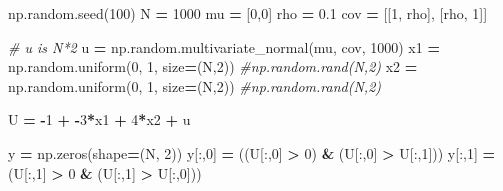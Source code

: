 \documentclass[
]{book}
\newenvironment{Shaded}{\begin{snugshade}}{\end{snugshade}}
\newcommand{\CommentTok}[1]{\textcolor[rgb]{0.56,0.35,0.01}{\textit{#1}}}
\newcommand{\DecValTok}[1]{\textcolor[rgb]{0.00,0.00,0.81}{#1}}
\newcommand{\FloatTok}[1]{\textcolor[rgb]{0.00,0.00,0.81}{#1}}
\newcommand{\NormalTok}[1]{#1}
\newcommand{\OperatorTok}[1]{\textcolor[rgb]{0.81,0.36,0.00}{\textbf{#1}}}
\theoremstyle{definition}
\theoremstyle{definition}
\theoremstyle{definition}
\theoremstyle{remark}
\begin{document}
\begin{Shaded}
\begin{Highlighting}[]
\NormalTok{np.random.seed(}\DecValTok{100}\NormalTok{)}
\NormalTok{N }\OperatorTok{=} \DecValTok{1000}
\NormalTok{mu }\OperatorTok{=}\NormalTok{ [}\DecValTok{0}\NormalTok{,}\DecValTok{0}\NormalTok{]}
\NormalTok{rho }\OperatorTok{=} \FloatTok{0.1}
\NormalTok{cov }\OperatorTok{=}\NormalTok{ [[}\DecValTok{1}\NormalTok{, rho], [rho, }\DecValTok{1}\NormalTok{]]}

\CommentTok{\# u is N*2}
\NormalTok{u }\OperatorTok{=}\NormalTok{ np.random.multivariate\_normal(mu, cov, }\DecValTok{1000}\NormalTok{)}
\NormalTok{x1 }\OperatorTok{=}\NormalTok{ np.random.uniform(}\DecValTok{0}\NormalTok{, }\DecValTok{1}\NormalTok{, size}\OperatorTok{=}\NormalTok{(N,}\DecValTok{2}\NormalTok{)) }\CommentTok{\#np.random.rand(N,2)}
\NormalTok{x2 }\OperatorTok{=}\NormalTok{ np.random.uniform(}\DecValTok{0}\NormalTok{, }\DecValTok{1}\NormalTok{, size}\OperatorTok{=}\NormalTok{(N,}\DecValTok{2}\NormalTok{)) }\CommentTok{\#np.random.rand(N,2)}

\NormalTok{U }\OperatorTok{=} \OperatorTok{{-}}\DecValTok{1} \OperatorTok{+} \OperatorTok{{-}}\DecValTok{3}\OperatorTok{*}\NormalTok{x1 }\OperatorTok{+} \DecValTok{4}\OperatorTok{*}\NormalTok{x2 }\OperatorTok{+}\NormalTok{ u}

\NormalTok{y }\OperatorTok{=}\NormalTok{ np.zeros(shape}\OperatorTok{=}\NormalTok{(N, }\DecValTok{2}\NormalTok{))}
\NormalTok{y[:,}\DecValTok{0}\NormalTok{] }\OperatorTok{=}\NormalTok{ ((U[:,}\DecValTok{0}\NormalTok{] }\OperatorTok{\textgreater{}} \DecValTok{0}\NormalTok{) }\OperatorTok{\&}\NormalTok{ (U[:,}\DecValTok{0}\NormalTok{] }\OperatorTok{\textgreater{}}\NormalTok{ U[:,}\DecValTok{1}\NormalTok{]))}
\NormalTok{y[:,}\DecValTok{1}\NormalTok{] }\OperatorTok{=}\NormalTok{ (U[:,}\DecValTok{1}\NormalTok{] }\OperatorTok{\textgreater{}} \DecValTok{0} \OperatorTok{\&}\NormalTok{ (U[:,}\DecValTok{1}\NormalTok{] }\OperatorTok{\textgreater{}}\NormalTok{ U[:,}\DecValTok{0}\NormalTok{]))}


\end{Highlighting}
\end{Shaded}
\end{document}
